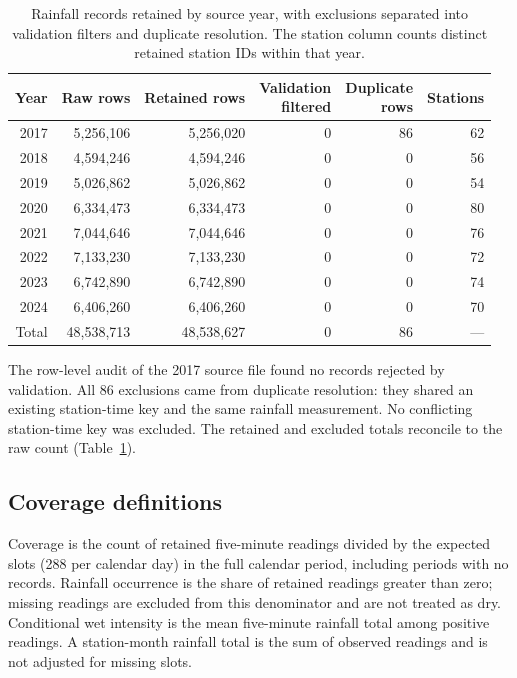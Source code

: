 \documentclass[11pt,a4paper]{article}
\begin{document}
\begin{table}[htbp]
\centering\small
\caption{Rainfall records retained by source year, with exclusions separated
into validation filters and duplicate resolution. The station column counts
distinct retained station IDs within that year.}
\label{tab:cleaning}
\begin{tabular}{r r r r r r}
\toprule
Year & Raw rows & Retained rows & \shortstack{Validation\\filtered} & \shortstack{Duplicate\\rows} & Stations \\
\midrule
2017 & 5,256,106 & 5,256,020 & 0 & 86 & 62 \\
2018 & 4,594,246 & 4,594,246 & 0 & 0 & 56 \\
2019 & 5,026,862 & 5,026,862 & 0 & 0 & 54 \\
2020 & 6,334,473 & 6,334,473 & 0 & 0 & 80 \\
2021 & 7,044,646 & 7,044,646 & 0 & 0 & 76 \\
2022 & 7,133,230 & 7,133,230 & 0 & 0 & 72 \\
2023 & 6,742,890 & 6,742,890 & 0 & 0 & 74 \\
2024 & 6,406,260 & 6,406,260 & 0 & 0 & 70 \\
\midrule
Total & 48,538,713 & 48,538,627 & 0 & 86 & --- \\
\bottomrule
\end{tabular}
\end{table}

The row-level audit of the 2017 source file found no records rejected by
validation. All 86 exclusions came from duplicate resolution: they shared an
existing station-time key and the same rainfall measurement. No conflicting
station-time key was excluded. The retained and excluded totals reconcile to
the raw count (Table~\ref{tab:cleaning}).

\subsection{Coverage definitions}
Coverage is the count of retained five-minute readings divided by the expected
slots (288 per calendar day) in the full calendar period, including periods
with no records. Rainfall
occurrence is the share of retained readings greater than zero; missing
readings are excluded from this denominator and are not treated as dry.
Conditional wet intensity is the mean five-minute rainfall total among
positive readings. A
station-month rainfall total is the sum of observed readings and is not
adjusted for missing slots.
\end{document}
